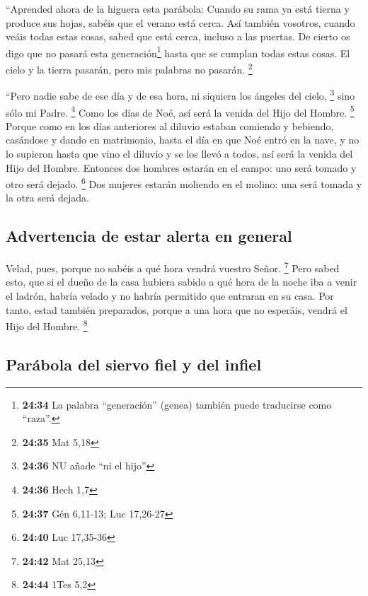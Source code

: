 \begin{paracol}{2}
 ``Aprended ahora de la higuera esta parábola: Cuando su
rama ya está tierna y produce sus hojas, sabéis que el verano está
cerca.  Así también vosotros, cuando veáis todas estas
cosas, sabed que está cerca, incluso a las puertas.  De
cierto os digo que no pasará esta generación\footnote{\textbf{24:34} La
  palabra ``generación'' (genea) también puede traducirse como ``raza''.}
hasta que se cumplan todas estas cosas.  El cielo y la
tierra pasarán, pero mis palabras no pasarán. \footnote{\textbf{24:35}
  Mat 5,18}

 ``Pero nadie sabe de ese día y de esa hora, ni siquiera
los ángeles del cielo, \footnote{\textbf{24:36} NU añade ``ni el hijo''}
sino sólo mi Padre. \footnote{\textbf{24:36} Hech 1,7} 
Como los días de Noé, así será la venida del Hijo del Hombre.
\footnote{\textbf{24:37} Gén 6,11-13; Luc 17,26-27} 
Porque como en los días anteriores al diluvio estaban comiendo y
bebiendo, casándose y dando en matrimonio, hasta el día en que Noé entró
en la nave,  y no lo supieron hasta que vino el diluvio y
se los llevó a todos, así será la venida del Hijo del Hombre.
 Entonces dos hombres estarán en el campo: uno será
tomado y otro será dejado. \footnote{\textbf{24:40} Luc 17,35-36}
 Dos mujeres estarán moliendo en el molino: una será
tomada y la otra será dejada.

\hypertarget{advertencia-de-estar-alerta-en-general}{%
\subsection{Advertencia de estar alerta en
general}\label{advertencia-de-estar-alerta-en-general}}

 Velad, pues, porque no sabéis a qué hora vendrá vuestro
Señor. \footnote{\textbf{24:42} Mat 25,13}  Pero sabed
esto, que si el dueño de la casa hubiera sabido a qué hora de la noche
iba a venir el ladrón, habría velado y no habría permitido que entraran
en su casa.  Por tanto, estad también preparados, porque
a una hora que no esperáis, vendrá el Hijo del Hombre. \footnote{\textbf{24:44}
  1Tes 5,2}

\hypertarget{paruxe1bola-del-siervo-fiel-y-del-infiel}{%
\subsection{Parábola del siervo fiel y del
infiel}\label{paruxe1bola-del-siervo-fiel-y-del-infiel}}


\end{paracol}
